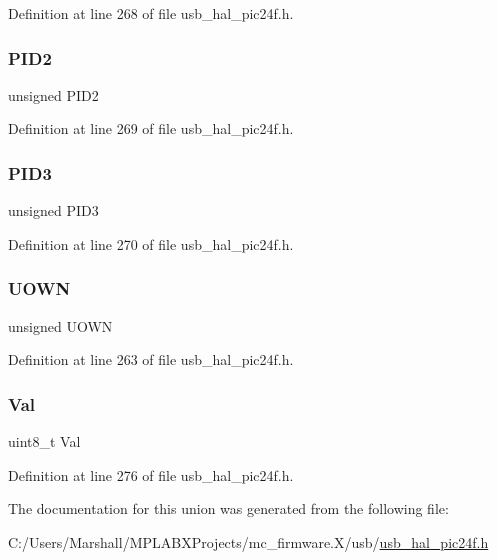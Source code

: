 Definition at line 268 of file usb\+\_\+hal\+\_\+pic24f.\+h.

\mbox{\label{union___b_d___s_t_a_t_aef3d6a9445a3c61d870212360c0a6110}} 
\subsubsection{\texorpdfstring{PID2}{PID2}}
{\footnotesize\ttfamily unsigned P\+I\+D2}



Definition at line 269 of file usb\+\_\+hal\+\_\+pic24f.\+h.

\mbox{\label{union___b_d___s_t_a_t_a771971768126aebea428ac7194b17fc0}} 
\subsubsection{\texorpdfstring{PID3}{PID3}}
{\footnotesize\ttfamily unsigned P\+I\+D3}



Definition at line 270 of file usb\+\_\+hal\+\_\+pic24f.\+h.

\mbox{\label{union___b_d___s_t_a_t_abc982c28d59f8e36dbcb06639010169d}} 
\subsubsection{\texorpdfstring{UOWN}{UOWN}}
{\footnotesize\ttfamily unsigned U\+O\+WN}



Definition at line 263 of file usb\+\_\+hal\+\_\+pic24f.\+h.

\mbox{\label{union___b_d___s_t_a_t_aa0c179f4462bb12ca1ed40d18c89cda1}} 
\subsubsection{\texorpdfstring{Val}{Val}}
{\footnotesize\ttfamily uint8\+\_\+t Val}



Definition at line 276 of file usb\+\_\+hal\+\_\+pic24f.\+h.



The documentation for this union was generated from the following file\+:\begin{DoxyCompactItemize}
\item 
C\+:/\+Users/\+Marshall/\+M\+P\+L\+A\+B\+X\+Projects/mc\+\_\+firmware.\+X/usb/\mbox{\hyperlink{usb__hal__pic24f_8h}{usb\+\_\+hal\+\_\+pic24f.\+h}}\end{DoxyCompactItemize}
